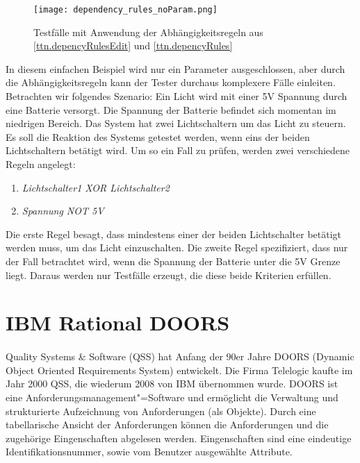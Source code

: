 \begin{figure}[h]
  \begin{center}
    \texttt{[image: dependency\_rules\_noParam.png]}
  		  \caption{Testfälle mit Anwendung der Abhängigkeitsregeln aus \ref{ttn.depencyRulesEdit} und \ref{ttn.depencyRules}}
     \label{ttn.testsequence}
  \end{center}
\end{figure}

In diesem einfachen Beispiel wird nur ein Parameter ausgeschlossen, aber durch die Abhängigkeitsregeln kann der Tester durchaus komplexere Fälle einleiten. Betrachten wir folgendes Szenario: Ein Licht wird mit einer 5V Spannung durch eine Batterie versorgt. Die Spannung der Batterie befindet sich momentan im niedrigen Bereich. Das System hat zwei Lichtschaltern um das Licht zu steuern. Es soll die Reaktion des Systems getestet werden, wenn eins der beiden Lichtschaltern betätigt wird. Um so ein Fall zu prüfen, werden zwei verschiedene Regeln angelegt:

\begin{enumerate}
\item \textit{Lichtschalter1 XOR Lichtschalter2}
\item \textit{Spannung NOT 5V}
\end{enumerate}

Die erste Regel besagt, dass mindestens einer der beiden Lichtschalter betätigt werden muss, um das Licht einzuschalten. Die zweite Regel spezifiziert, dass nur der Fall betrachtet wird, wenn die Spannung der Batterie unter die 5V Grenze liegt. Daraus werden nur Testfälle erzeugt, die diese beide Kriterien erfüllen.





\newpage
\section{IBM Rational DOORS}\label{sec:DOORS}
\paragraph{}

Quality Systems \& Software (QSS) hat Anfang der 90er Jahre DOORS (Dynamic Object Oriented Requirements System) entwickelt. Die Firma Telelogic kaufte im Jahr 2000 QSS, die wiederum 2008 von IBM übernommen wurde. DOORS ist eine Anforderungsmanagement"=Software und ermöglicht die Verwaltung und strukturierte Aufzeichnung von Anforderungen (als Objekte). Durch eine tabellarische Ansicht der Anforderungen können die Anforderungen und die zugehörige Eingenschaften abgelesen werden. Eingenschaften sind eine eindeutige Identifikationsnummer, sowie vom Benutzer ausgewählte Attribute.\\


